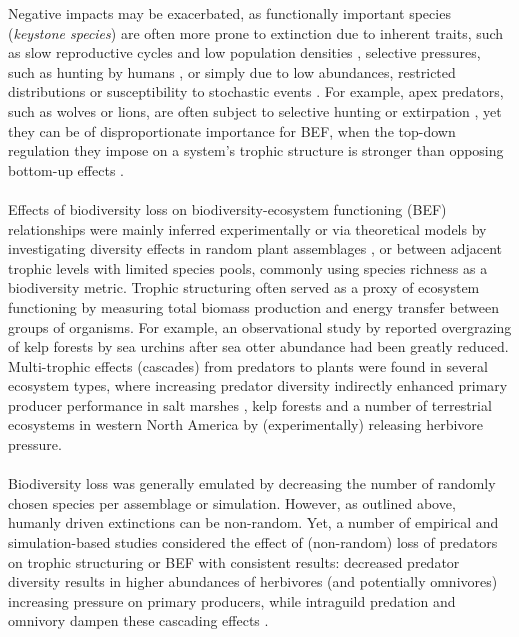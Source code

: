 Negative impacts may be exacerbated, as functionally important species (\emph{keystone species}) are often more prone to extinction due to inherent traits, such as slow reproductive cycles and low population densities \citep{Cardillo2005}, selective pressures, such as hunting by humans \citep{Dobson2006}, or simply due to low abundances, restricted distributions or susceptibility to stochastic events \citep{MacArthur1967,Smith2003}. For example,
apex predators, such as wolves or lions, are often subject to selective hunting or extirpation \citep{Dobson2006,Ripple2014}, yet they can be of disproportionate importance for BEF, when the top-down regulation they impose on a system's trophic structure is stronger than opposing bottom-up effects \citep{Borer2006,Estes2011}.
 \\\\
Effects of biodiversity loss on biodiversity-ecosystem functioning (BEF) relationships were mainly inferred experimentally or via theoretical models by investigating diversity effects in random plant assemblages \citep[e.g.][]{Tilman2001,Hector2007,Isbell2011}, or between adjacent trophic levels \citep[mostly plant-herbivore interactions, e.g.][]{Thebault2003,Bruno2008} with limited species pools, commonly using species richness as a biodiversity metric. Trophic structuring often served as a proxy of ecosystem functioning by measuring total biomass production and energy transfer between groups of organisms. For example, an observational study by \cite{Estes1974} reported overgrazing of kelp forests by sea urchins after sea otter abundance had been greatly reduced. 
Multi-trophic effects (cascades) from predators to plants were found in several ecosystem types, where increasing predator diversity indirectly enhanced primary producer performance in salt marshes \citep{Finke2004}, kelp forests \citep{Byrnes2006} and a number  of terrestrial ecosystems in western North America \citep{Beschta2009} by (experimentally) releasing herbivore pressure. \\\\
%
Biodiversity loss was generally emulated by decreasing the number of randomly chosen species per assemblage or simulation.  However, as outlined above, humanly driven extinctions can be non-random.
Yet, a number of empirical \citep{Sih1998,OConnor2008} and simulation-based\citep{Borrvall2000,Ives2005} studies considered the effect of (non-random) loss of predators on trophic structuring or BEF with consistent results: decreased predator diversity results in higher abundances of herbivores (and potentially omnivores) increasing pressure on primary producers, while intraguild predation and omnivory dampen these cascading effects \citep{Duffy2007}. \\\\
